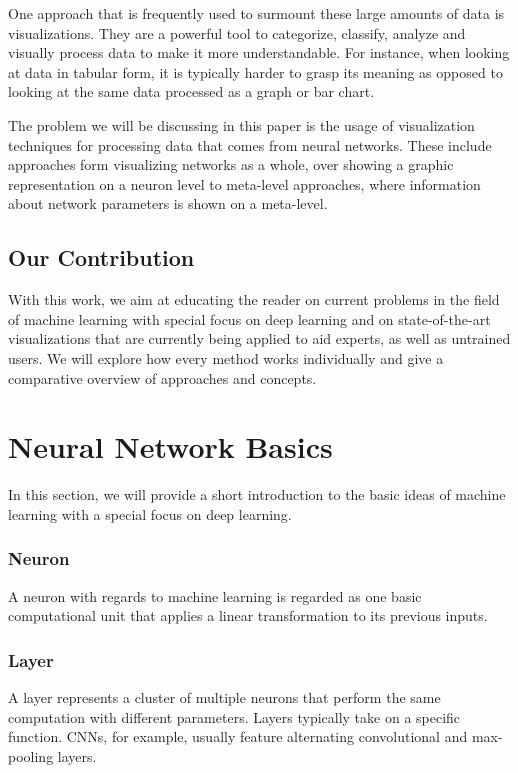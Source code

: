 \documentclass{acmsiggraph}               %
\begin{document}
One approach that is frequently used to surmount these large amounts of data is visualizations. They are a powerful tool to categorize, classify, analyze and visually process data to make it more understandable. For instance, when looking at data in tabular form, it is typically harder to grasp its meaning as opposed to looking at the same data processed as a graph or bar chart.

The problem we will be discussing in this paper is the usage of visualization techniques for processing data that comes from neural networks. These include approaches form visualizing networks as a whole, over showing a graphic representation on a neuron level to meta-level approaches, where information about network parameters is shown on a meta-level.

\subsection{Our Contribution}
With this work, we aim at educating the reader on current problems in the field of machine learning with special focus on deep learning and on state-of-the-art visualizations that are currently being applied to aid experts, as well as untrained users. We will explore how every method works individually and give a comparative overview of approaches and concepts.

\section{Neural Network Basics}
In this section, we will provide a short introduction to the basic ideas of machine learning with a special focus on deep learning.

\subsubsection{Neuron}
A neuron with regards to machine learning is regarded as one basic computational unit that applies a linear transformation to its previous inputs.

\subsubsection{Layer}
A layer represents a cluster of multiple neurons that perform the same computation with different parameters. Layers typically take on a specific function. CNNs, for example, usually feature alternating convolutional and max-pooling layers. 
\end{document}
